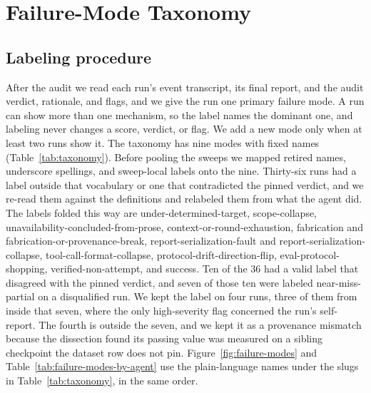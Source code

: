 \section{Failure-Mode Taxonomy}
\label{app:taxonomy}

\subsection{Labeling procedure}

After the audit we read each run's event transcript, its final report, and
the audit verdict, rationale, and flags, and we give the run one primary
failure mode. A run can show more than one mechanism, so the label names the
dominant one, and labeling never changes a score, verdict, or flag. We add a
new mode only when at least two runs show it. The taxonomy has nine modes with
fixed names (Table~\ref{tab:taxonomy}). Before pooling the sweeps we mapped
retired names, underscore spellings, and sweep-local labels onto the nine.
Thirty-six runs had a label outside that vocabulary or one that contradicted
the pinned verdict, and we re-read them against the definitions and relabeled
them from what the agent did. The labels folded this way are
under-determined-target, scope-collapse, unavailability-concluded-from-prose,
context-or-round-exhaustion, fabrication and fabrication-or-provenance-break,
report-serialization-fault and report-serialization-collapse,
tool-call-format-collapse, protocol-drift-direction-flip,
eval-protocol-shopping, verified-non-attempt, and success. Ten of the 36
had a valid label that disagreed with the pinned verdict, and seven of those
ten were labeled near-miss-partial on a disqualified run. We kept the label on
four runs, three of them from inside that seven, where the only high-severity
flag concerned the run's self-report. The fourth is outside the seven, and we
kept it as a provenance mismatch because the dissection found its passing value
was measured on a sibling checkpoint the dataset row does not pin.
Figure~\ref{fig:failure-modes} and Table~\ref{tab:failure-modes-by-agent} use
the plain-language names under the slugs in Table~\ref{tab:taxonomy}, in the
same order.

